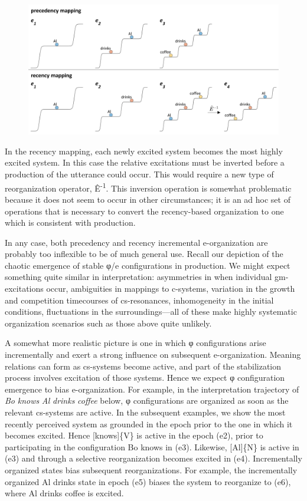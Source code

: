   
\begin{figure}
\includegraphics[width=\textwidth]{figures/Tilsen-img128.png}
\caption{\missingcaption}
\label{fig:}
\end{figure}
 

  In the recency mapping, each newly excited system becomes the most highly excited system. In this case the relative excitations must be inverted before a production of the utterance could occur. This would require a new type of reorganization operator, Ê\textsuperscript{{}-1}. This inversion operation is somewhat problematic because it does not seem to occur in other circumstances; it is an ad hoc set of operations that is necessary to convert the recency-based organization to one which is consistent with production.

  In any case, both precedency and recency incremental e-organization are probably too inflexible to be of much general use. Recall our depiction of the chaotic emergence of stable φ/e configurations in production. We might expect something quite similar in interpretation: asymmetries in when individual gm-excitations occur, ambiguities in mappings to c-systems, variation in the growth and competition timecourses of cs-resonances, inhomogeneity in the initial conditions, fluctuations in the surroundings—all of these make highly systematic organization scenarios such as those above quite unlikely.

  A somewhat more realistic picture is one in which φ configurations arise incrementally and exert a strong influence on subsequent e-organization. Meaning relations can form as cs-systems become active, and part of the stabilization process involves excitation of those systems. Hence we expect φ configuration emergence to bias e-organization. For example, in the interpretation trajectory of \textit{Bo} \textit{knows} \textit{Al} \textit{drinks} \textit{coffee} below, φ configurations are organized as soon as the relevant cs-systems are active. In the subsequent examples, we show the most recently perceived system as grounded in the epoch prior to the one in which it becomes excited.  Hence [knows]\{V\} is active in the epoch (e2), prior to participating in the configuration {\textbar}Bo knows{\textbar} in (e3). Likewise, [Al]\{N\} is active in (e3) and through a selective reorganization becomes excited in (e4). Incrementally organized states bias subsequent reorganizations. For example, the incrementally organized {\textbar}Al drinks{\textbar} state in epoch (e5) biases the system to reorganize to (e6), where {\textbar}Al drinks coffee{\textbar} is excited. 

